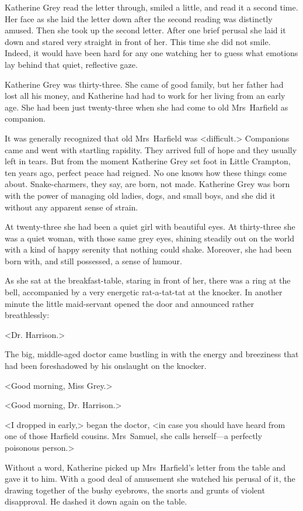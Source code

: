Katherine Grey read the letter through, smiled a little, and read it a second time. Her face as she laid the letter down after the second reading was distinctly amused. Then she took up the second letter. After one brief perusal she laid it down and stared very straight in front of her. This time she did not smile. Indeed, it would have been hard for any one watching her to guess what emotions lay behind that quiet, reflective gaze.

Katherine Grey was thirty-three. She came of good family, but her father had lost all his money, and Katherine had had to work for her living from an early age. She had been just twenty-three when she had come to old Mrs~Harfield as companion.

It was generally recognized that old Mrs~Harfield was <difficult.> Companions came and went with startling rapidity. They arrived full of hope and they usually left in tears. But from the moment Katherine Grey set foot in Little Crampton, ten years ago, perfect peace had reigned. No one knows how these things come about. Snake-charmers, they say, are born, not made. Katherine Grey was born with the power of managing old ladies, dogs, and small boys, and she did it without any apparent sense of strain.

At twenty-three she had been a quiet girl with beautiful eyes. At thirty-three she was a quiet woman, with those same grey eyes, shining steadily out on the world with a kind of happy serenity that nothing could shake. Moreover, she had been born with, and still possessed, a sense of humour.

As she sat at the breakfast-table, staring in front of her, there was a ring at the bell, accompanied by a very energetic rat-a-tat-tat at the knocker. In another minute the little maid-servant opened the door and announced rather breathlessly:

<Dr. Harrison.>

The big, middle-aged doctor came bustling in with the energy and breeziness that had been foreshadowed by his onslaught on the knocker.

<Good morning, Miss Grey.>

<Good morning, Dr. Harrison.>

<I dropped in early,> began the doctor, <in case you should have heard from one of those Harfield cousins. Mrs~Samuel, she calls herself—a perfectly poisonous person.>

Without a word, Katherine picked up Mrs~Harfield's letter from the table and gave it to him. With a good deal of amusement she watched his perusal of it, the drawing together of the bushy eyebrows, the snorts and grunts of violent disapproval. He dashed it down again on the table.

